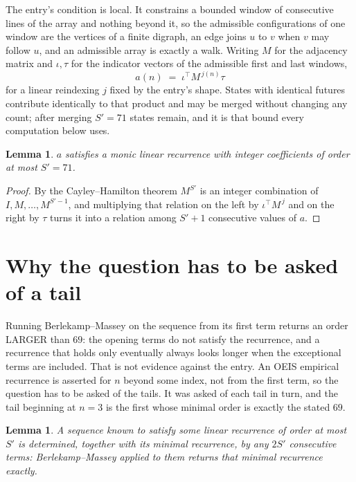 \documentclass[11pt,a4paper]{article}
\theoremstyle{plain}
\newtheorem{lemma}[theorem]{Lemma}
\theoremstyle{definition}
\begin{document}
The entry's condition is local. It constrains a bounded window of consecutive lines of the
array and nothing beyond it, so the admissible configurations of one window are the vertices of
a finite digraph, an edge joins $u$ to $v$ when $v$ may follow $u$, and an admissible array is
exactly a walk. Writing $M$ for the adjacency matrix and $\iota,\tau$ for the indicator vectors
of the admissible first and last windows,
\[
a(n)\;=\;\iota^{\!\top}M^{\,j(n)}\tau
\]
for a linear reindexing $j$ fixed by the entry's shape. States with identical futures
contribute identically to that product and may be merged without changing any count; after
merging $S'=71$ states remain, and it is that bound every computation below uses.

\begin{lemma}\label{lem:cf}
$a$ satisfies a monic linear recurrence with integer coefficients of order at most $S'=71$.
\end{lemma}

\begin{proof}
By the Cayley--Hamilton theorem $M^{S'}$ is an integer combination of $I,M,\dots,M^{S'-1}$,
and multiplying that relation on the left by $\iota^{\!\top}M^{\,j}$ and on the right by
$\tau$ turns it into a relation among $S'+1$ consecutive values of $a$.
\end{proof}

\section{Why the question has to be asked of a tail}

Running Berlekamp--Massey on the sequence from its first term returns an order LARGER than $69$: the opening terms do not satisfy the recurrence, and a recurrence that holds only eventually always looks longer when the exceptional terms are included. That is not evidence against the entry. An OEIS empirical recurrence is asserted for $n$ beyond some index, not from the first term, so the question has to be asked of the tails. It was asked of each tail in turn, and the tail beginning at $n=3$ is the first whose minimal order is exactly the stated $69$.

\begin{lemma}\label{lem:bm}
A sequence known to satisfy some linear recurrence of order at most $S'$ is determined,
together with its minimal recurrence, by any $2S'$ consecutive terms: Berlekamp--Massey applied
to them returns that minimal recurrence exactly.
\end{lemma}
\end{document}
